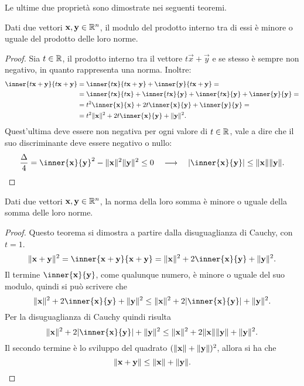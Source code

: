 Le ultime due proprietà sono dimostrate nei seguenti teoremi.
\begin{teorema}
Dati due vettori $\mathbf{x}, \mathbf{y}\in\mathbb{R}^n$, il modulo del prodotto interno tra di essi è minore o uguale del prodotto delle loro norme.
\end{teorema}
\begin{proof}
Sia $t\in\mathbb{R}$, il prodotto interno tra il vettore $t\vec x+\vec y$ e se stesso è sempre non negativo, in quanto rappresenta una norma. Inoltre:
\begin{align*}
	\inner{t\vec x+\vec y}{t\vec x+\vec y}
	&=\inner{t\vec x}{t\vec x+\vec y}+\inner{\vec y}{t\vec x+\vec y}=\\
	&=\inner{t\vec x}{t\vec x}+\inner{t\vec x}{\vec y}+\inner{t\vec x}{\vec y}+\inner{\vec y}{\vec y}=\\
	&=t^2\inner{\vec x}{\vec x}+2t\inner{\vec x}{\vec y}+\inner{\vec y}{\vec y}=\\
	&=t^2\norm{\vec x}^2+2t\inner{\vec x}{\vec y}+\norm{\vec y}^2.
\end{align*}
Quest'ultima deve essere non negativa per ogni valore di $t\in\mathbb{R}$, vale a dire che il suo discriminante deve essere negativo o nullo:
\begin{equation}
	\frac{\Delta}{4}=\inner{\vec x}{\vec y}^2-\norm{\vec x}^2\norm{\vec y}^2\leq 0\qqq
	\abs{\inner{\vec x}{\vec y}}\leq\norm{\vec x}\norm{\vec y}.\qedhere
\end{equation}
\end{proof}
\begin{teorema}
Dati due vettori $\mathbf{x}, \mathbf{y}\in\mathbb{R}^n$, la norma della loro somma è minore o uguale della somma delle loro norme.
\end{teorema}
\begin{proof}
Questo teorema si dimostra a partire dalla disuguaglianza di Cauchy, con $t=1$.
\[
	\norm{\vec x+\vec y}^2=\inner{\vec x+\vec y}{\vec x+\vec y}=\norm{\vec x}^2+2\inner{\vec x}{\vec y}+\norm{\vec y}^2.
\]
Il termine $\inner{\vec x}{\vec y}$, come qualunque numero, è minore o uguale del suo modulo, quindi si può scrivere che
\[
	\norm{\vec x}^2+2\inner{\vec x}{\vec y}+\norm{\vec y}^2\leq\norm{\vec x}^2+2\abs{\inner{\vec x}{\vec y}}+\norm{\vec y}^2.
\]
Per la disuguaglianza di Cauchy quindi risulta
\[
	\norm{\vec x}^2+2\abs{\inner{\vec x}{\vec y}}+\norm{\vec y}^2\leq\norm{\vec x}^2+2\norm{\vec x}\norm{\vec y}+\norm{\vec y}^2.
\]
Il secondo termine è lo sviluppo del quadrato $(\lVert\mathbf{x}\rVert+\lVert\mathbf{y}\rVert)^2$, allora si ha che
\[
\lVert\mathbf{x}+\mathbf{y}\rVert\leq\lVert\mathbf{x}\rVert+\lVert\mathbf{y}\rVert.\qedhere
\]
\end{proof}

